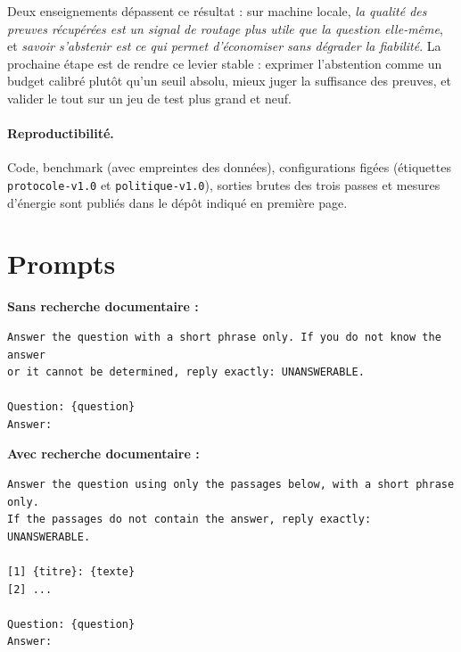 \documentclass[11pt,a4paper]{article}
\begin{document}
Deux enseignements dépassent ce résultat : sur machine locale, \emph{la qualité des preuves récupérées
est un signal de routage plus utile que la question elle-même}, et \emph{savoir s'abstenir est ce qui
permet d'économiser sans dégrader la fiabilité}. La prochaine étape est de rendre ce levier stable :
exprimer l'abstention comme un budget calibré plutôt qu'un seuil absolu, mieux juger la suffisance des
preuves, et valider le tout sur un jeu de test plus grand et neuf.

\paragraph{Reproductibilité.} Code, benchmark (avec empreintes des données), configurations figées
(étiquettes \texttt{protocole-v1.0} et \texttt{politique-v1.0}), sorties brutes des trois passes et
mesures d'énergie sont publiés dans le dépôt indiqué en première page.




\appendix
\section{Prompts}\label{ann:prompts}
\textbf{Sans recherche documentaire :}
\begin{small}
\begin{verbatim}
Answer the question with a short phrase only. If you do not know the answer
or it cannot be determined, reply exactly: UNANSWERABLE.

Question: {question}
Answer:
\end{verbatim}
\end{small}
\textbf{Avec recherche documentaire :}
\begin{small}
\begin{verbatim}
Answer the question using only the passages below, with a short phrase only.
If the passages do not contain the answer, reply exactly: UNANSWERABLE.

[1] {titre}: {texte}
[2] ...

Question: {question}
Answer:
\end{verbatim}
\end{small}
\end{document}
